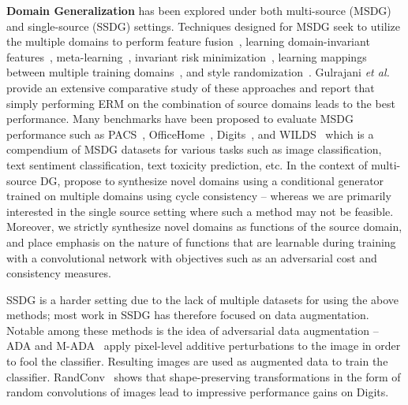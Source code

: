 \textbf{Domain Generalization}
has been explored under both multi-source (MSDG) and single-source (SSDG) settings. Techniques designed for MSDG seek to utilize the multiple domains to perform feature fusion~\citep{shen2019situational}, learning domain-invariant features~\citep{ganin2016domain}, meta-learning~\citep{li2018learning}, invariant risk minimization~\citep{arjovsky2019invariant}, learning mappings between multiple training domains~\citep{robey2021model}, and style randomization~\citep{nam2021reducing}.
Gulrajani  \textit{et al.}~\citep{gulrajani2021in} provide an extensive comparative study of these approaches and report that simply performing ERM on the combination of source domains leads to the best performance. Many benchmarks have been proposed to evaluate MSDG performance such as PACS~\citep{li2017deeper}, OfficeHome~\citep{venkateswara2017deep}, Digits~\citep{volpi2018generalizing}, and WILDS~\citep{koh2021wilds} which is a compendium of MSDG datasets for various tasks such as image classification, text sentiment classification, text toxicity prediction, etc. In the context of multi-source DG, \citep{zhou2020learning} propose to synthesize novel domains using a conditional generator trained on multiple domains using cycle consistency -- whereas we are primarily interested in the single source setting where such a method may not be feasible. Moreover, we strictly synthesize novel domains as functions of the source domain, and place emphasis on the nature of functions that are learnable during training with a convolutional network with objectives such as an adversarial cost and consistency measures.

SSDG is a harder setting due to the lack of multiple datasets for using the above methods; most work in SSDG has therefore focused on data augmentation.
Notable among these methods is the idea of adversarial data augmentation -- ADA\citep{volpi2018generalizing} and M-ADA~\citep{qiao2020learning} apply pixel-level additive perturbations to the image in order to fool the classifier.  Resulting images are used as augmented data to train the classifier.
RandConv~\citep{xu2020robust} shows that shape-preserving transformations in the form of random convolutions of images lead to impressive performance gains on Digits.

